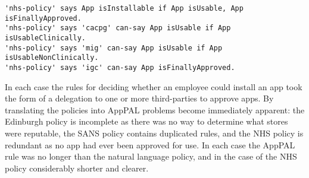 \documentclass{easychair}
\begin{document}
\begin{lstlisting}[title={\footnotesize\textbf{NHS}:~\itshape ``%
Apps for work usage must not be downloaded onto corporately issued mobile devices (even if approved on the NHS apps store) unless they have been approved through the following Trust channels: 
    Clinical apps;
        at the time of writing there are no apps clinically approved by the Trust for use with patients / clients. 
        However, if a member of staff believes that there are clinical apps or other technologies that could benefit their patients / clients, this should be discussed with the clinical lead in the first instance and ratification should be sought via the Care and Clinical Policies Group. 
        A clinical app should not be used if it has not been approved via this group. 
    Business apps; 
        at the time of writing there are no business (i.e., non-clinical) apps approved by the Trust for use other than those preloaded onto the device at the point of issue. 
        However, if a member of staff believes that there are apps or other technologies that could benefit their non-clinical work, ratification of the app must be sought via the Management of Information Group (MIG). 
        An app should not be used if it has not been approved via this group.
Following approval through Care and Clinical Policies and / or MIG, final approval will be required through Integrated Governance Committee.''}]
'nhs-policy' says App isInstallable if App isUsable, App isFinallyApproved.
'nhs-policy' says 'cacpg' can-say App isUsable if App isUsableClinically.
'nhs-policy' says 'mig' can-say App isUsable if App isUsableNonClinically.
'nhs-policy' says 'igc' can-say App isFinallyApproved.
\end{lstlisting}

In each case the rules for deciding whether an employee could install an app took the form of a delegation to one or more third-parties to approve apps.
By translating the policies into AppPAL problems become immediately apparent: the Edinburgh policy is incomplete as there was no way to determine what stores were reputable, the SANS policy contains duplicated rules, and the NHS policy is redundant as no app had ever been approved for use. 
In each case the AppPAL rule was no longer than the natural language policy, and in the case of the NHS policy considerably shorter and clearer.
\end{document}
